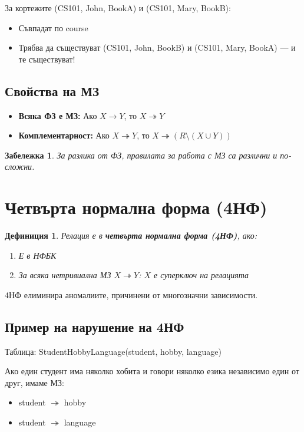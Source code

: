 \documentclass{scrartcl}
\newtheorem{definition}{Дефиниция}
\newtheorem{remark}{Забележка}
\begin{document}
\begin{FlushLeft}
За кортежите (CS101, John, BookA) и (CS101, Mary, BookB):
\begin{itemize}
    \item Съвпадат по course
    \item Трябва да съществуват (CS101, John, BookB) и (CS101, Mary, BookA) --- и те съществуват!
\end{itemize}

\subsection{Свойства на МЗ}

\begin{itemize}
    \item \textbf{Всяка ФЗ е МЗ:} Ако $X \rightarrow Y$, то $X \twoheadrightarrow Y$
    
    \item \textbf{Комплементарност:} Ако $X \twoheadrightarrow Y$, то $X \twoheadrightarrow (R \setminus (X \cup Y))$
\end{itemize}

\begin{remark}
За разлика от ФЗ, правилата за работа с МЗ са различни и по-сложни.
\end{remark}

\section{Четвърта нормална форма (4НФ)}

\begin{definition}
Релация е в \textbf{\textit{четвърта нормална форма (4НФ)}}, ако:
\begin{enumerate}
    \item Е в НФБК
    \item За всяка нетривиална МЗ $X \twoheadrightarrow Y$: $X$ е суперключ на релацията
\end{enumerate}
\end{definition}

4НФ елиминира аномалиите, причинени от многозначни зависимости.

\subsection{Пример на нарушение на 4НФ}

Таблица: StudentHobbyLanguage(student, hobby, language)

Ако един студент има няколко хобита и говори няколко езика независимо един от друг, имаме МЗ:
\begin{itemize}
    \item student $\twoheadrightarrow$ hobby
    \item student $\twoheadrightarrow$ language
\end{itemize}


\end{FlushLeft}
\end{document}
